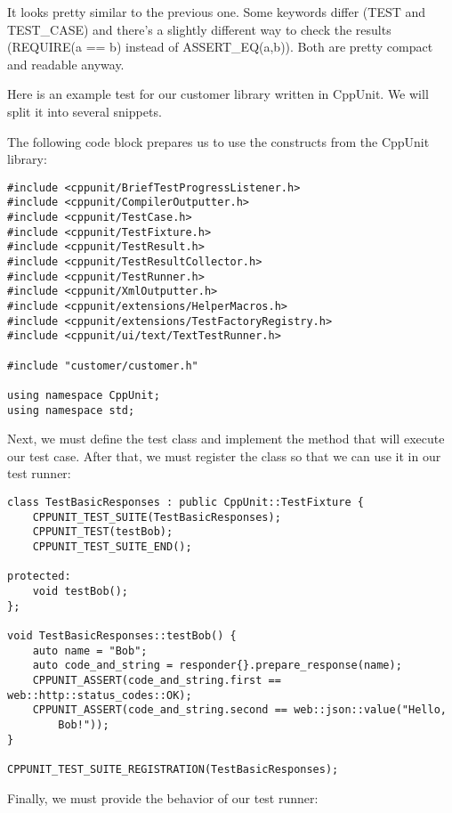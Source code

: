It looks pretty similar to the previous one. Some keywords differ (TEST and TEST\_CASE) and there's a slightly different way to check the results (REQUIRE(a == b) instead of ASSERT\_EQ(a,b)). Both are pretty compact and readable anyway.


Here is an example test for our customer library written in CppUnit. We will split it into several snippets.

The following code block prepares us to use the constructs from the CppUnit library:

\begin{lstlisting}[style=styleCXX]
#include <cppunit/BriefTestProgressListener.h>
#include <cppunit/CompilerOutputter.h>
#include <cppunit/TestCase.h>
#include <cppunit/TestFixture.h>
#include <cppunit/TestResult.h>
#include <cppunit/TestResultCollector.h>
#include <cppunit/TestRunner.h>
#include <cppunit/XmlOutputter.h>
#include <cppunit/extensions/HelperMacros.h>
#include <cppunit/extensions/TestFactoryRegistry.h>
#include <cppunit/ui/text/TextTestRunner.h>

#include "customer/customer.h"

using namespace CppUnit;
using namespace std;
\end{lstlisting}

Next, we must define the test class and implement the method that will execute our test case. After that, we must register the class so that we can use it in our test runner:

\begin{lstlisting}[style=styleCXX]
class TestBasicResponses : public CppUnit::TestFixture {
	CPPUNIT_TEST_SUITE(TestBasicResponses);
	CPPUNIT_TEST(testBob);
	CPPUNIT_TEST_SUITE_END();
	
protected:
	void testBob();
};

void TestBasicResponses::testBob() {
	auto name = "Bob";
	auto code_and_string = responder{}.prepare_response(name);
	CPPUNIT_ASSERT(code_and_string.first == web::http::status_codes::OK);
	CPPUNIT_ASSERT(code_and_string.second == web::json::value("Hello,
		Bob!"));
}

CPPUNIT_TEST_SUITE_REGISTRATION(TestBasicResponses);
\end{lstlisting}

Finally, we must provide the behavior of our test runner:

